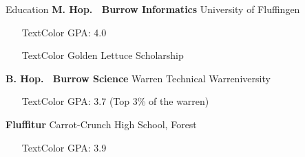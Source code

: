 \begin{rubric}{Education}
%
%
\textbf{M. Hop.~ Burrow Informatics} University of Fluffingen\par
	\begin{itemize}[label={-}, labelsep=2pt, leftmargin=5pt]
	\setlength\itemsep{0.0em}
	\item[TextColor] GPA: 4.0
	\item[TextColor] Golden Lettuce Scholarship
	\end{itemize}

%
	\textbf{B. Hop.~ Burrow Science} Warren Technical Warreniversity\par
	\begin{itemize}[label={-}, labelsep=2pt, leftmargin=5pt]
		\setlength\itemsep{0.0em}
		\item[TextColor] GPA: 3.7 (Top 3\% of the warren)
	\end{itemize}

%
	\textbf{Fluffitur} Carrot-Crunch High School, Forest \par
	\begin{itemize}[label={-}, labelsep=2pt, leftmargin=5pt]
		\setlength\itemsep{0.0em}
		\item[TextColor] GPA: 3.9
		\vspace*{-\baselineskip}
	\end{itemize}
\end{rubric}